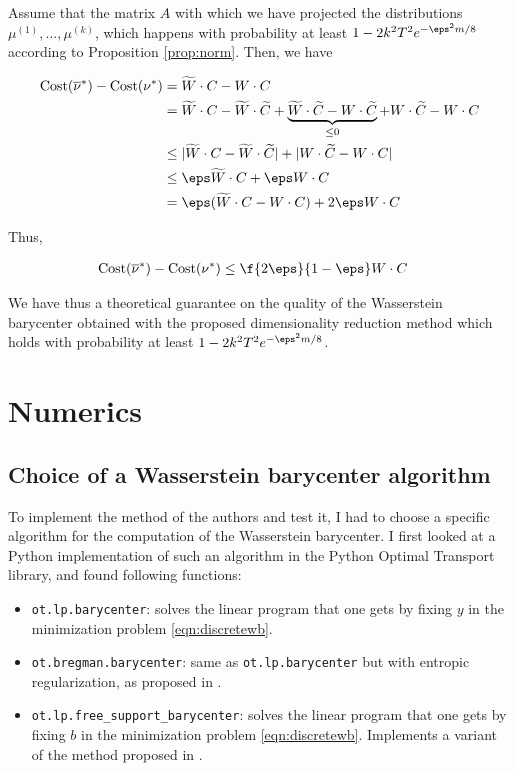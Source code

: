 \documentclass[11pt,a4paper]{article}
\begin{document}
Assume that the matrix $A$ with which we have projected the distributions $\mu^{(1)}, ..., \mu^{(k)}$, which happens with probability at least $1 - 2k^2T^2e^{-\eps^2 m / 8}$ according to Proposition \ref{prop:norm}. Then, we have

\begin{align*}
    \text{Cost}(\overline{\nu}^*) - \text{Cost}(\nu^*) &= \widetilde{W} \cdot C - W \cdot C \\
    &= \widetilde{W} \cdot C - \widetilde{W} \cdot \widetilde{C} 
    + \underbrace{\widetilde{W} \cdot \widetilde{C} - W \cdot \widetilde{C}}_{\leq 0} 
    + W \cdot \widetilde{C} - W \cdot C \\
    &\leq |\widetilde{W} \cdot C - \widetilde{W} \cdot \widetilde{C}| + |W \cdot \widetilde{C} - W \cdot C| \\
    &\leq \eps \widetilde{W} \cdot C + \eps W \cdot C \\
    &= \eps (\widetilde{W} \cdot C - W \cdot C) + 2 \eps W \cdot C
\end{align*}

Thus, 

\begin{align}
    \text{Cost}(\overline{\nu}^*) - \text{Cost}(\nu^*) &\leq \f {2\eps} {1 - \eps} W \cdot C
\end{align}

We have thus a theoretical guarantee on the quality of the Wasserstein barycenter obtained with the proposed dimensionality reduction method which holds with probability at least $1 - 2k^2T^2e^{-\eps^2 m / 8}$.

\section{Numerics}

\subsection{Choice of a Wasserstein barycenter algorithm}

To implement the method of the authors and test it, I had to choose a specific algorithm for the computation of the Wasserstein barycenter. I first looked at a Python implementation of such an algorithm in the Python Optimal Transport library, and found following functions:

\begin{itemize}
    \item \verb|ot.lp.barycenter|: solves the linear program that one gets by fixing $y$ in the minimization problem \ref{eqn:discretewb}.
    \item \verb|ot.bregman.barycenter|: same as \verb|ot.lp.barycenter| but with entropic regularization, as proposed in \cite{benamou_iterative_2015}.
    \item \verb|ot.lp.free_support_barycenter|: solves the linear program that one gets by fixing $b$ in the minimization problem \ref{eqn:discretewb}. Implements a variant of the method proposed in \cite{cuturi_fast_2014}.
\end{itemize}
\end{document}
